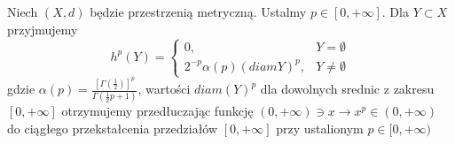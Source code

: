 \begin{defi}
	Niech $(X, d)$ będzie przestrzenią metryczną. Ustalmy $p \in [0, +\infty]$. Dla $Y \subset X$ przyjmujemy 
	$$
		h^p(Y) = 
		\begin{cases}
			0, & Y = \emptyset \\
			2^{-p}\alpha(p)(diam Y)^p, & Y \neq \emptyset
		\end{cases}
	$$ gdzie $\alpha(p) = \frac{[\Gamma(\frac{1}{2})]^p}{\Gamma(\frac{1}{2}p + 1)}$, wartości $diam(Y)^p$ dla dowolnych srednic z zakresu $[0, +\infty]$ otrzymujemy przedłuczając funkcję $(0, +\infty) \ni x \rightarrow x^p \in (0, +\infty)$ do ciągłego przekstałcenia przedziałów $[0, +\infty]$ przy ustalionym $p \in [0, +\infty)$ 
\end{defi}